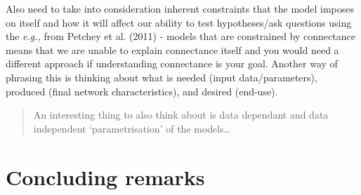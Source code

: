 \documentclass[
]{article}
\begin{document}
\begin{tcolorbox}
Also need to take into consideration inherent constraints that the model
imposes on itself and how it will affect our ability to test
hypotheses/ask questions using the \emph{e.g.,} from Petchey et al.
(2011) - models that are constrained by connectance means that we are
unable to explain connectance itself and you would need a different
approach if understanding connectance is your goal. Another way of
phrasing this is thinking about what is needed (input data/parameters),
produced (final network characteristics), and desired (end-use).

\begin{quote}
An interesting thing to also think about is data dependant and data
independent `parametrisation' of the models\ldots{}
\end{quote}

\end{tcolorbox}

\section{Concluding remarks}\label{concluding-remarks}
\end{document}

